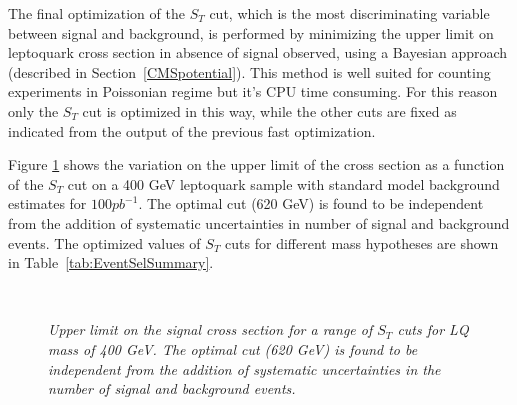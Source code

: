 The final optimization of the $S_T$ cut, which is the most discriminating variable between signal and background, 
is performed by minimizing the upper limit on leptoquark cross section in absence of signal observed, 
using a Bayesian approach (described in Section~\ref{CMSpotential}). 
This method is well suited for counting experiments in Poissonian regime but it's CPU time consuming. 
For this reason only the $S_T$ cut is optimized in this way, while the other cuts are fixed as indicated from 
the output of the previous fast optimization.

Figure \ref{fig:optimization} shows the variation on the upper limit of the cross section as a function of 
the $S_T$ cut on a 400 GeV leptoquark sample with standard model background estimates for $100 pb^{-1}$.  
The optimal cut (620 GeV) is found to be independent from the addition 
of systematic uncertainties in number of signal and background events.
The optimized values of $S_{T}$ cuts for different mass hypotheses are shown in Table~\ref{tab:EventSelSummary}. 
%
\begin{figure}[htbp]
  \begin{center}
       \\
    \caption{\small \sl Upper limit on the signal cross section for a range of $S_T$ cuts for LQ mass of 400 GeV. 
      The optimal cut (620 GeV) is found to be independent from the addition of systematic uncertainties in the 
      number of signal and background events.}
    \label{fig:optimization}
  \end{center}
\end{figure}
%

%
